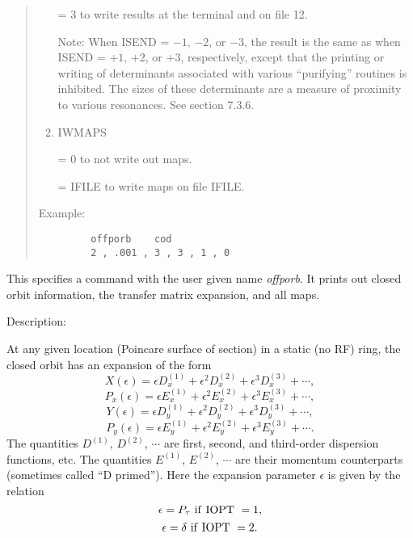 \begin{quotation}
\begin{enumerate}
             = 3 to write results at the terminal and on file 12.

Note:  When ISEND = $-1$, $-2$, or $-3$, the result is the same as
             when ISEND = $+1$, $+2$, or $+3$, respectively, except that the
             printing or writing of determinants associated with various
             ``purifying'' routines is inhibited.  The sizes of these
             determinants are a measure of proximity to various resonances.  See section 7.3.6.


      \item  IWMAPS

             = 0 to not write out maps.

             = IFILE to write maps on file IFILE.
\end{enumerate}

\vspace{5mm}
\noindent Example:
\begin{verbatim}
         offporb    cod
         2 , .001 , 3 , 3 , 1 , 0
\end{verbatim}
\end{quotation}
This specifies a command with the user given name {\em offporb}.  It prints out closed orbit information, the transfer matrix expansion, and all maps.

\vspace{5mm}
     Description:
\vspace{2mm}

At any given location (Poincare surface of section) in a static (no RF)
ring, the closed orbit has an expansion of the form
\begin{equation}
X(\epsilon ) = \epsilon D^{(1)}_x + \epsilon^2 D^{(2)}_x +
\epsilon^3 D^{(3)}_x + \cdots ,
\end{equation}
\begin{equation}
P_x(\epsilon ) = \epsilon E^{(1)}_x + \epsilon^2 E^{(2)}_x +
\epsilon^3 E^{(3)}_x + \cdots ,
\end{equation}
\begin{equation}
Y (\epsilon ) = \epsilon D^{(1)}_y + \epsilon^2 D^{(2)}_y +
\epsilon^3 D^{(3)}_y + \cdots ,
\end{equation}
\begin{equation}
P_y(\epsilon ) = \epsilon E^{(1)}_y + \epsilon^2 E^{(2)}_y +
\epsilon^3 E^{(3)}_y + \cdots .
\end{equation}
The quantities $D^{(1)}$, $D^{(2)}$, $\cdots$ are first, second,
and third-order dispersion functions, etc.    The quantities
$E^{(1)}$, $E^{(2)}$, $\cdots$ are their momentum counterparts
(sometimes called ``D primed'').  Here the expansion parameter
$\epsilon$ is given by the relation
\begin{equation}
\epsilon = P_{\tau} \ {\rm if \ IOPT} \ = 1,
\end{equation}
\begin{equation}
\epsilon = \delta \ {\rm if \ IOPT} \ = 2.
\end{equation}

